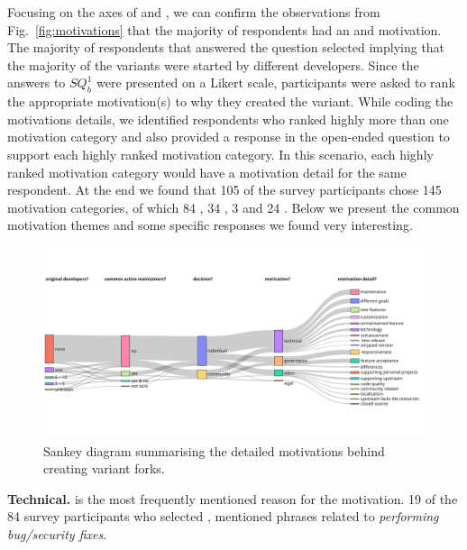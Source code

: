 Focusing on the axes of  and , we can confirm the observations from Fig.~\ref{fig:motivations} that the majority of respondents had an  and  motivation.
The majority of respondents that answered the question  selected  implying that the majority of the variants were started by different developers.
Since the answers to $SQ^1_{b}$ were presented on a Likert scale, participants were asked to rank the appropriate motivation(s) to why they created the variant. While coding the motivations details, we identified respondents who ranked highly more than one motivation category and also provided a response in the open-ended question to support each highly ranked motivation category. In this scenario, each highly ranked motivation category would have a motivation detail for the same respondent. %
At the end we found that 105 of the survey participants chose 145 motivation categories, of which 84 , 34 , 3  and 24 . Below we present the common motivation themes and some  specific responses we found very
interesting.

\begin{figure}[ht]
\begin{center}
    \centering
    \includegraphics[width=\textwidth]{pdfs/sankey_motivations_2.pdf}
    \caption{Sankey diagram summarising the detailed motivations behind creating variant forks.
    }
    \label{fig:sankey_motivation}
\end{center}
\vspace{-.3cm}
\end{figure}

\nd \textbf{Technical.}  is the most frequently mentioned reason for the  motivation. 19 of the 84 survey participants who selected , mentioned phrases related to \emph{performing bug/security fixes}.

